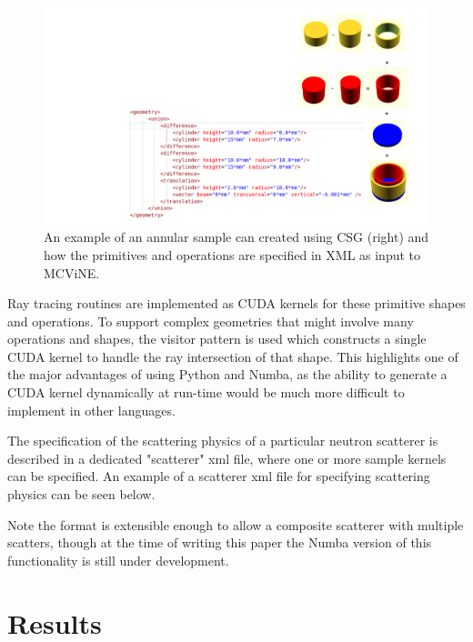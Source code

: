 \begin{figure}[h]
    \centering
    \includegraphics[trim = {7cm 0 0 0 }, width=\columnwidth]{figures/mcvine_CSG_example.png}
    \caption{An example of an annular sample can  created using CSG (right) and how the primitives and operations are specified in XML as input to MCViNE.}
    \label{fig:csg}
\end{figure}

Ray tracing routines are implemented as CUDA kernels for these primitive shapes and operations. To support complex geometries that might involve many operations and shapes, the visitor pattern is used which constructs a single CUDA kernel to handle the ray intersection of that shape. This highlights one of the major advantages of using Python and Numba, as the ability to generate a CUDA kernel dynamically at run-time would be much more difficult to implement in other languages.

The specification of the scattering physics of a particular neutron scatterer is described in a dedicated "scatterer" xml file, where one or more sample kernels can be specified.
An example of a scatterer xml file for specifying scattering physics can be seen below.

\vspace{1mm}

\vspace{1mm}

Note the format is extensible enough to allow a composite scatterer with multiple scatters, though at the time of writing this paper the Numba version of this functionality is still under development.


\section{Results}

